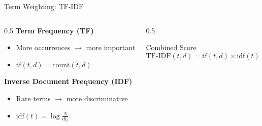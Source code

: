 \documentclass[aspectratio=169]{beamer}
\newif\ifanimated
\newcommand{\cpause}{\ifanimated\pause\fi}
\begin{document}
\begin{frame}{Term Weighting: TF-IDF}
\begin{columns}
\begin{column}{0.5\textwidth}
\textbf{Term Frequency (TF)}
\begin{itemize}
    \item More occurrences $\rightarrow$ more important
    \item $\text{tf}(t,d) = \text{count}(t,d)$
\end{itemize}\cpause

\vspace{1em}

\textbf{Inverse Document Frequency (IDF)}
\begin{itemize}
    \item Rare terms $\rightarrow$ more discriminative
    \item $\text{idf}(t) = \log\frac{N}{\text{df}_t}$
\end{itemize}
\end{column}

\begin{column}{0.5\textwidth}
\begin{block}{Combined Score}
$$\text{TF-IDF}(t,d) = \text{tf}(t,d) \times \text{idf}(t)$$
\end{block}

\end{column}
\end{columns}
\end{frame}
\end{document}
